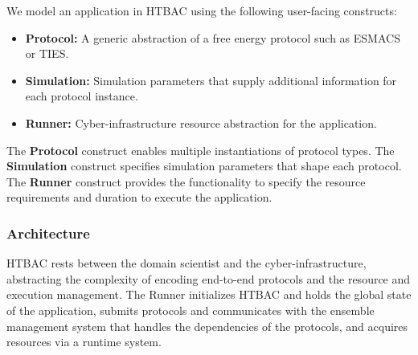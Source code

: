 We model an application in HTBAC using the following user-facing 
constructs:

\begin{itemize}
  \item \textbf{Protocol:} A generic abstraction of a free energy protocol
  such as ESMACS or TIES.
  \item \textbf{Simulation:} Simulation parameters that supply additional
  information for each protocol instance.
  \item \textbf{Runner:} Cyber-infrastructure resource abstraction for the
  application.
\end{itemize}

The \textbf{Protocol} construct  enables multiple instantiations of protocol types. 
The \textbf{Simulation} construct  specifies simulation parameters that shape 
each protocol. The \textbf{Runner} construct provides the functionality to 
specify the resource requirements and duration to execute the application.

\subsubsection{Architecture}

HTBAC rests between the domain scientist and the cyber-infrastructure, 
abstracting the complexity of encoding end-to-end protocols and the resource and 
execution management. The Runner initializes HTBAC and holds the global state of 
the application, submits protocols and communicates with the ensemble management 
system that handles the dependencies of the protocols, and acquires resources 
via a runtime system. 









